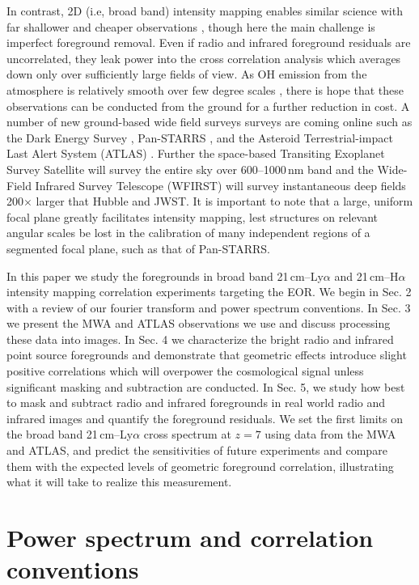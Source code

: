 \documentclass[numberedappendix]{emulateapj}
\begin{document}
In contrast, 2D (i.e, broad band) intensity mapping enables similar science with far shallower and cheaper observations \citep{StarsAndReionization,mao14}, though here the main challenge is imperfect foreground removal. Even if radio and infrared foreground residuals are uncorrelated, they leak power into the cross correlation analysis which averages down only over sufficiently large fields of view. As OH emission from the atmosphere is relatively smooth over few degree scales \citep{high10}, there is hope that these observations can be conducted from the ground for a further reduction in cost. A number of new ground-based wide field surveys surveys are coming online such as the Dark Energy Survey \citep{des16}, Pan-STARRS \citep{tonry12}, and the Asteroid Terrestrial-impact Last Alert System (ATLAS) \citep{tonry11}. Further the space-based  Transiting Exoplanet Survey Satellite \citep{ricker14} will survey the entire sky over 600--1000\,nm band and the Wide-Field Infrared Survey Telescope (WFIRST) \citep{Spergel2013} will survey instantaneous deep fields 200$\times$ larger that Hubble and JWST. It is important to note that a large, uniform focal plane greatly facilitates intensity mapping, lest structures on relevant angular scales be lost in the calibration of many independent regions of a segmented focal plane, such as that of Pan-STARRS. 

In this paper we study the foregrounds in broad band 21\,cm--Ly$\alpha$ and 21\,cm--H$\alpha$ intensity mapping correlation experiments targeting the EOR. We begin in Sec. 2 with a review of our fourier transform and power spectrum conventions.
  In Sec. 3 we present the MWA and ATLAS observations we use and discuss processing these data into images. 
   In Sec. 4 we characterize the bright radio and infrared point source foregrounds and 
   demonstrate that geometric effects introduce slight positive correlations which will overpower the cosmological signal
   unless significant masking and subtraction are conducted. 
   In Sec. 5, we study how best to mask and subtract radio and infrared foregrounds in real world radio and infrared images and 
   quantify the foreground residuals. We set the first limits 
   on the broad band 21\,cm--Ly$\alpha$ cross spectrum at $z=7$ using data from the MWA
     and ATLAS, and predict the sensitivities of future experiments and compare them with the expected levels of geometric foreground correlation, 
     illustrating what it will take to realize this measurement.

\section{Power spectrum and correlation conventions}
\label{sec:pspecconventions}
\end{document}
